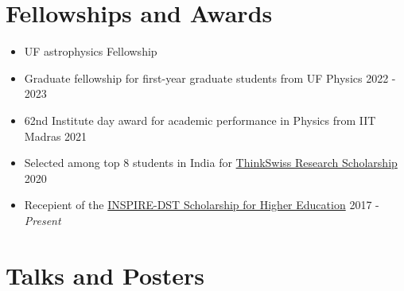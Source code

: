 \documentclass[margin, centered]{res}
\begin{document}
\begin{resume}
\section{Fellowships and Awards}
\begin{itemize}[leftmargin=*]
 \item UF astrophysics Fellowship
 \item {\color{C2} Graduate fellowship} for first-year graduate students from UF Physics \hfill 2022 - 2023
 \item {\color{C2} 62nd Institute day} award for academic performance in Physics from IIT Madras \hfill 2021
 \item Selected among top 8 students in India for \href{https://swissnex.org/india/thinkswiss/}{ThinkSwiss Research Scholarship} \hfill 2020

 \item Recepient of the \href{http://www.inspire-dst.gov.in/scholarship.html}{INSPIRE-DST Scholarship for Higher Education}  \hfill 2017 - \textit{Present}
\end{itemize}


\section{Talks and Posters}


\end{resume}
\end{document}
